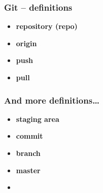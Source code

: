 \documentclass{beamer}
\begin{document}
    \begin{frame}
        \frametitle{Git -- definitions}
        \begin{itemize}
            \item \textbf{repository (repo)}
            \item \textbf{origin}
            \item \textbf{push}
            \item \textbf{pull}
        \end{itemize}

    \end{frame}



    \begin{frame}
        \frametitle{And more definitions\dots}
        \begin{itemize}
            \item \textbf{staging area}
            \item \textbf{commit}
            \item \textbf{branch}
            \item \textbf{master}
            \item \textbf{}
        \end{itemize}

    \end{frame}


%    
%    
\end{document}

